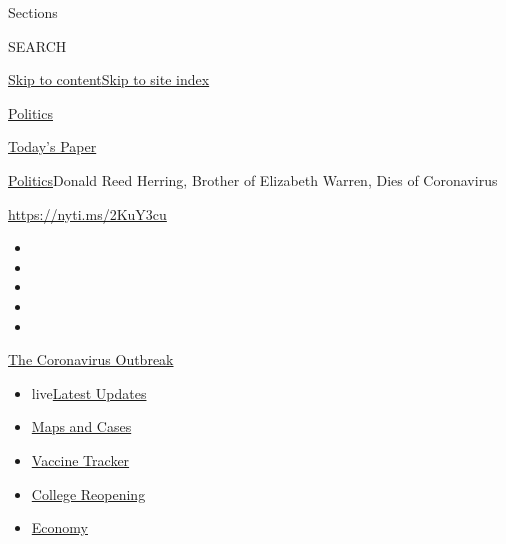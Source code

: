 Sections

SEARCH

\protect\hyperlink{site-content}{Skip to
content}\protect\hyperlink{site-index}{Skip to site index}

\href{https://www.nytimes.com/section/politics}{Politics}

\href{https://myaccount.nytimes.com/auth/login?response_type=cookie\&client_id=vi}{}

\href{https://www.nytimes.com/section/todayspaper}{Today's Paper}

\href{/section/politics}{Politics}\textbar{}Donald Reed Herring, Brother
of Elizabeth Warren, Dies of Coronavirus

\url{https://nyti.ms/2KuY3cu}

\begin{itemize}
\item
\item
\item
\item
\item
\end{itemize}

\href{https://www.nytimes.com/news-event/coronavirus?action=click\&pgtype=Article\&state=default\&region=TOP_BANNER\&context=storylines_menu}{The
Coronavirus Outbreak}

\begin{itemize}
\tightlist
\item
  live\href{https://www.nytimes.com/2020/08/03/world/coronavirus-covid-19.html?action=click\&pgtype=Article\&state=default\&region=TOP_BANNER\&context=storylines_menu}{Latest
  Updates}
\item
  \href{https://www.nytimes.com/interactive/2020/us/coronavirus-us-cases.html?action=click\&pgtype=Article\&state=default\&region=TOP_BANNER\&context=storylines_menu}{Maps
  and Cases}
\item
  \href{https://www.nytimes.com/interactive/2020/science/coronavirus-vaccine-tracker.html?action=click\&pgtype=Article\&state=default\&region=TOP_BANNER\&context=storylines_menu}{Vaccine
  Tracker}
\item
  \href{https://www.nytimes.com/2020/08/02/us/covid-college-reopening.html?action=click\&pgtype=Article\&state=default\&region=TOP_BANNER\&context=storylines_menu}{College
  Reopening}
\item
  \href{https://www.nytimes.com/live/2020/08/03/business/stock-market-today-coronavirus?action=click\&pgtype=Article\&state=default\&region=TOP_BANNER\&context=storylines_menu}{Economy}
\end{itemize}

